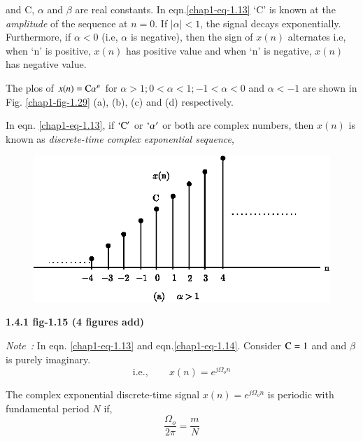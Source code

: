 and C, $\alpha$ and $\beta$ are real constants. In eqn.\ref{chap1-eq-1.13} `C' is known at the \textit{amplitude} of the sequence at $n=0$. If $|\alpha| < 1$, the signal decays exponentially. Furthermore, if $\alpha < 0$ (i.e, $\alpha$ is negative), then the sign of $x(n)$ alternates i.e, when `n' is positive, $x(n)$ has positive value and when `n' is negative, $x(n)$ has negative value.

The plos of $x(n) = \textrm{C} \alpha^{n}$ for $\alpha > 1; 0< \alpha < 1 ; -1 < \alpha < 0$ and $\alpha < -1$  are shown in Fig. \ref{chap1-fig-1.29} (a), (b), (c) and (d) respectively.

In eqn. \ref{chap1-eq-1.13}, if $`\textrm{C}'$ or $`\alpha'$ or both are complex numbers, then $x(n)$ is known as \textit{discrete-time complex exponential sequence},

\begin{figure}[H]
\centering
\includegraphics{src/chap1/fig.1.15(a).eps}
\end{figure}

\begin{center}
{\bf 1.4.1 fig-1.15  (4 figures add)}
\end{center}

\noindent
\textit{Note~:} In eqn. \ref{chap1-eq-1.13} and eqn.\ref{chap1-eq-1.14}. Consider $\textrm{C}=1$ and and $\beta$ is purely imaginary.
\begin{equation}
\text{i.e.}, \qquad  x(n)= e^{j\Omega_{o}n}\label{chap1-eq-1.15}
\end{equation} 

The complex exponential discrete-time signal $x(n)= e^{j\Omega_{o}n}$  is periodic with fundamental period $N$ if,
\begin{equation}
\dfrac{\Omega_{o}}{2 \pi} = \dfrac{m}{N}\label{chap1-eq-1.16}
\end{equation}

